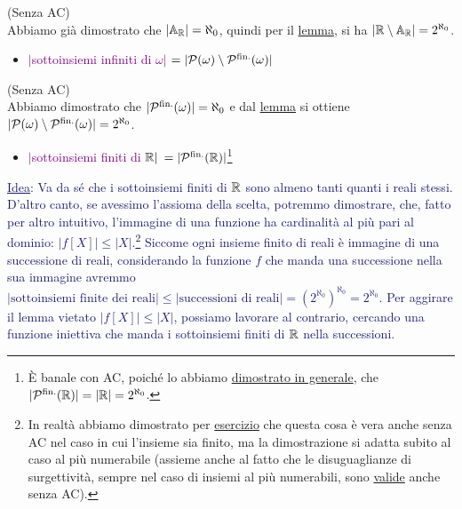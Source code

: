 \begin{soln}
	(Senza AC)\\
	Abbiamo già dimostrato che $|\mathbb A_\mathbb R| = \aleph_0$, quindi per il \hyperref[continuo-numerabile]{lemma}, si ha $|\mathbb R \setminus \mathbb{A}_{\mathbb R}| = 2^{\aleph_0}$.
\end{soln}

\begin{itemize}
	\item \textcolor{purple}{$|$sottoinsiemi infiniti di $\omega|$ $= |\mathcal{P}(\omega) \setminus \mathcal{P}^{\text{fin.}}(\omega)|$}
\end{itemize}

\begin{soln}
	(Senza AC)\\
	Abbiamo dimostrato che $|\mathcal{P}^{\text{fin.}}(\omega)| = \aleph_0$ e dal \hyperref[continuo-numerabile]{lemma} si ottiene $|\mathcal{P}(\omega) \setminus \mathcal{P}^{\text{fin.}}(\omega)| = 2^{\aleph_0}$.
\end{soln}

\begin{itemize}
	\item \textcolor{purple}{$|$sottoinsiemi finiti di $\mathbb R|$ $= |\mathcal{P}^{\text{fin.}}(\mathbb R)|$}\footnote{È banale con AC, poiché lo abbiamo \hyperref[parti_finite_generale]{dimostrato in generale}, che $|\mathcal{P}^{\text{fin.}}(\mathbb R)| = |\mathbb R| = 2^{\aleph_0}$.}
\end{itemize}

\textcolor{MidnightBlue}{\underline{Idea}: Va da sé che i sottoinsiemi finiti di $\mathbb R$ sono almeno tanti quanti i reali stessi. D'altro canto, se avessimo l'assioma della scelta,
potremmo dimostrare, che, fatto per altro intuitivo, l'immagine di una funzione ha cardinalità al più pari al dominio: $|f[X]| \leq |X|$.\footnote{In realtà abbiamo dimostrato per \hyperref[disuguaglianze_senza_AC1]{esercizio} che questa cosa è vera anche senza AC nel caso in cui l'insieme sia finito, ma la dimostrazione si adatta subito al caso al più numerabile (assieme anche al fatto che le disuguaglianze di surgettività, sempre nel caso di insiemi al più numerabili, sono \hyperref[disuguaglianze_senza_AC2]{valide} anche senza AC).}
Siccome ogni insieme finito di reali è immagine di una successione di reali, considerando la funzione $f$ che manda una successione nella sua immagine avremmo $|\text{sottoinsiemi finite dei reali}| \leq |\text{successioni di reali}| = (2^{\aleph_0})^{\aleph_0} = 2^{\aleph_0}$.
Per aggirare il lemma vietato $|f[X]|\leq |X|$, possiamo lavorare al contrario, cercando una funzione iniettiva che manda i sottoinsiemi finiti di $\mathbb R$ nella successioni.}


